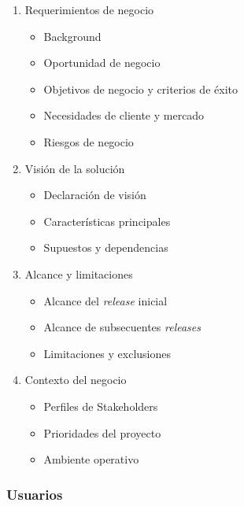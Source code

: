         \begin{enumerate}
            \item Requerimientos de negocio
                \begin{itemize}
                    \item Background
                    \item Oportunidad de negocio
                    \item Objetivos de negocio y criterios de éxito
                    \item Necesidades de cliente y mercado
                    \item Riesgos de negocio
                \end{itemize}
            \item Visión de la solución
                \begin{itemize}
                    \item Declaración de visión
                    \item Características principales
                    \item Supuestos y dependencias
                \end{itemize}
            \item Alcance y limitaciones
                \begin{itemize}
                    \item Alcance del \textit{release} inicial
                    \item Alcance de subsecuentes \textit{releases}
                    \item Limitaciones y exclusiones
                \end{itemize}
            \item Contexto del negocio
                \begin{itemize}
                    \item Perfiles de Stakeholders
                    \item Prioridades del proyecto
                    \item Ambiente operativo
                \end{itemize}
        \end{enumerate}
        
        \subsubsection*{Usuarios}
        
